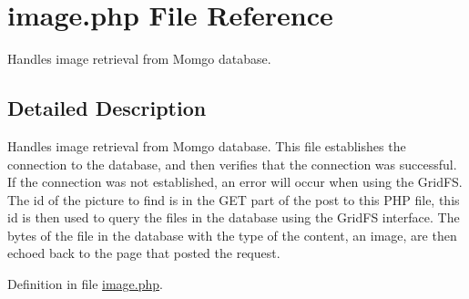 \hypertarget{image_8php}{\section{image.\-php \-File \-Reference}
\label{image_8php}
}


\-Handles image retrieval from \-Momgo database.  




\subsection{\-Detailed \-Description}
\-Handles image retrieval from \-Momgo database. \-This file establishes the connection to the database, and then verifies that the connection was successful. \-If the connection was not established, an error will occur when using the \-Grid\-F\-S. \-The id of the picture to find is in the \-G\-E\-T part of the post to this \-P\-H\-P file, this id is then used to query the files in the database using the \-Grid\-F\-S interface. \-The bytes of the file in the database with the type of the content, an image, are then echoed back to the page that posted the request. 

\-Definition in file \hyperlink{image_8php_source}{image.\-php}.

